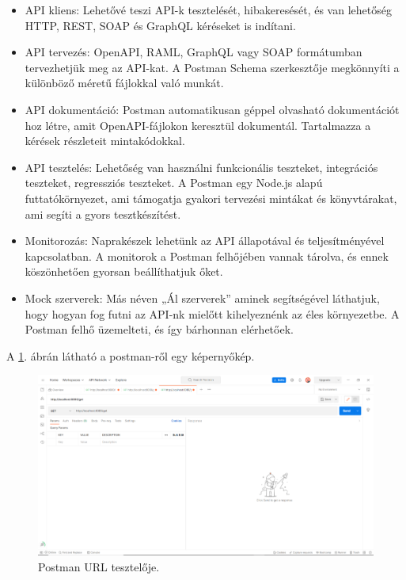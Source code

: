 \begin{itemize}
\item API kliens: Lehetővé teszi API-k tesztelését, hibakeresését, és van lehetőség 
HTTP, REST, SOAP és GraphQL kéréseket is indítani.
\item API tervezés: OpenAPI, RAML, GraphQL vagy SOAP formátumban tervezhetjük meg az API-kat. A Postman Schema szerkesztője megkönnyíti a különböző méretű fájlokkal való munkát.
\item API dokumentáció: Postman automatikusan géppel olvasható dokumentációt hoz létre, amit OpenAPI-fájlokon keresztül dokumentál. Tartalmazza a kérések részleteit mintakódokkal.
\item API tesztelés: Lehetőség van használni funkcionális teszteket, integrációs teszteket, regressziós teszteket. A Postman egy Node.js alapú futtatókörnyezet, ami támogatja gyakori tervezési mintákat és  könyvtárakat, ami segíti a gyors tesztkészítést.
\item Monitorozás: Naprakészek lehetünk az API állapotával és teljesítményével kapcsolatban. A monitorok a Postman felhőjében vannak tárolva, és ennek köszönhetően gyorsan beállíthatjuk őket.
\item Mock szerverek: Más néven „Ál szerverek” aminek segítségével láthatjuk, hogy hogyan fog futni az API-nk mielőtt kihelyeznénk az éles környezetbe. A Postman felhő üzemelteti, és így bárhonnan elérhetőek.
\end{itemize}

A \ref{fig:Postman}. ábrán látható a postman-ről egy képernyőkép.

\begin{figure}[h]
\centering
\includegraphics[scale=0.8]{images/Postman.png}
\caption{Postman URL tesztelője.}
\label{fig:Postman}
\end{figure}
\newpage

